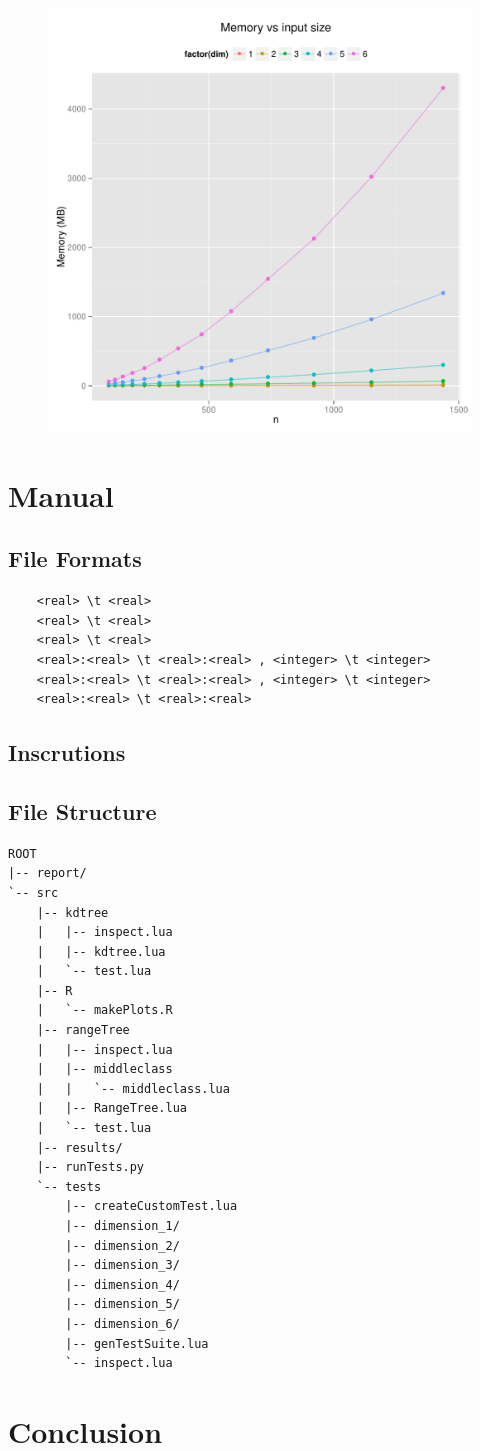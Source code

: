 \documentclass{article}
\begin{document}
\begin{figure}[H]
    \centering
    \includegraphics[width=\textwidth]{../src/R/plots/rtmem.pdf}
\end{figure}
\section{Manual}
  \subsection{File Formats}
  \begin{verbatim}
  	<real> \t <real>
  	<real> \t <real>
  	<real> \t <real>
  	<real>:<real> \t <real>:<real> , <integer> \t <integer>
  	<real>:<real> \t <real>:<real> , <integer> \t <integer>
  	<real>:<real> \t <real>:<real>
  \end{verbatim}

  \subsection{Inscrutions}
\subsection{File Structure}
\begin{verbatim}
ROOT
|-- report/
`-- src
    |-- kdtree
    |   |-- inspect.lua
    |   |-- kdtree.lua
    |   `-- test.lua
    |-- R
    |   `-- makePlots.R
    |-- rangeTree
    |   |-- inspect.lua
    |   |-- middleclass
    |   |   `-- middleclass.lua
    |   |-- RangeTree.lua
    |   `-- test.lua
    |-- results/
    |-- runTests.py
    `-- tests
        |-- createCustomTest.lua
        |-- dimension_1/
        |-- dimension_2/
        |-- dimension_3/
        |-- dimension_4/
        |-- dimension_5/
        |-- dimension_6/
        |-- genTestSuite.lua
        `-- inspect.lua
\end{verbatim}

\section{Conclusion}
\end{document}
